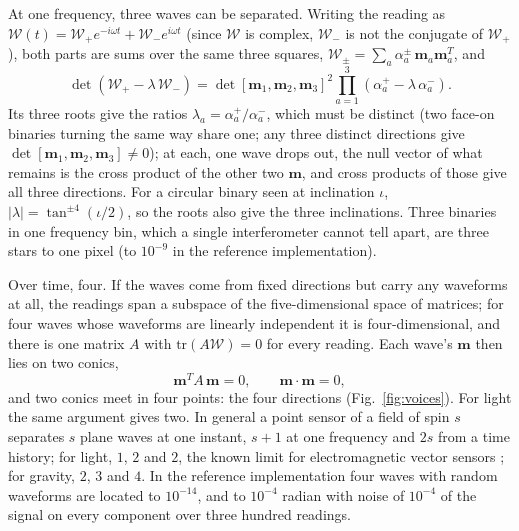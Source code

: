 At one frequency, three waves can be separated. Writing the reading as
$\mathcal{W}(t) = \mathcal{W}_+e^{-i\omega t} + \mathcal{W}_-e^{i\omega t}$ (since $\mathcal W$ is
complex, $\mathcal W_-$ is not the conjugate of $\mathcal W_+$), both parts are sums
over the same three squares, $\mathcal{W}_\pm = \sum_a \alpha_a^\pm\,
\mathbf{m}_a\mathbf{m}_a^{T}$, and
\begin{equation}\label{eq:pencil}
\det(\mathcal{W}_+ - \lambda\,\mathcal{W}_-) = \det[\mathbf{m}_1,\mathbf{m}_2,\mathbf{m}_3]^2
\prod_{a=1}^{3}(\alpha^+_a - \lambda\,\alpha^-_a) .
\end{equation}
Its three roots give the ratios $\lambda_a = \alpha_a^+/\alpha_a^-$, which must be
distinct (two face-on binaries turning the same way share one; any three distinct
directions give $\det[\mathbf m_1,\mathbf m_2,\mathbf m_3] \neq 0$); at each, one
wave drops out, the null vector of what remains is the cross product of the other
two $\mathbf{m}$, and cross products of those give all three directions. For a
circular binary seen at inclination $\iota$, $|\lambda| = \tan^{\pm4}(\iota/2)$,
so the roots also give the three inclinations. Three binaries in one frequency
bin, which a single interferometer cannot tell apart, are three stars to one
pixel (to $10^{-9}$ in the reference implementation).

Over time, four. If the waves come from fixed directions but carry any
waveforms at all, the readings span a subspace of the five-dimensional space of
matrices; for four waves whose waveforms are linearly independent it is
four-dimensional, and there is one matrix $A$ with
$\mathrm{tr}(A\mathcal{W}) = 0$ for every reading. Each wave's $\mathbf{m}$ then lies on
two conics,
\begin{equation}\label{eq:four-waves}
\mathbf{m}^{T}\!A\,\mathbf{m} = 0, \qquad \mathbf{m}\cdot\mathbf{m} = 0 ,
\end{equation}
and two conics meet in four points: the four directions (Fig.~\ref{fig:voices}).
For light the same argument gives two. In general a point sensor of a field of spin $s$ separates
$s$ plane waves at one instant, $s + 1$ at one frequency and $2s$ from a time
history; for light, $1$, $2$ and $2$, the known limit for electromagnetic vector
sensors \cite{NehoraiPaldi1994,HochwaldNehorai1996}; for gravity, $2$, $3$ and
$4$. In the reference implementation four waves with random waveforms are
located to $10^{-14}$, and to $10^{-4}$ radian with noise of $10^{-4}$ of the
signal on every component over three hundred readings.

